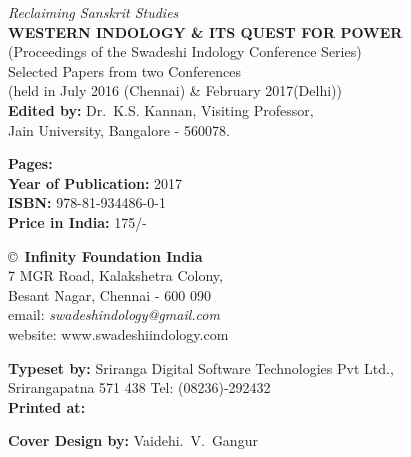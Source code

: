 \thispagestyle{empty}
\noindent
{\fontsize{9}{11}\selectfont\sl Reclaiming Sanskrit Studies}\\
{\bf WESTERN INDOLOGY \& ITS QUEST FOR POWER}\\ 
(Proceedings of the Swadeshi Indology Conference Series)\\
Selected Papers from two Conferences\\ 
(held in July 2016 (Chennai) \& February 2017(Delhi))\\
{\bf Edited by:} Dr.\ K.S. Kannan, Visiting Professor,\\ 
Jain University, Bangalore - 560078.
\vfill

\noindent
{\bf Pages:} \pageref{bookend}\\
{\bf Year of Publication:} 2017\\
{\bf ISBN:} 978-81-934486-0-1\\
{\bf Price in India:} 175/-
\vfill

\noindent
\copyright\ {\bf Infinity Foundation India}\\ 
7 MGR Road, Kalakshetra Colony,\\ 
Besant Nagar, Chennai - 600 090\\
email: {\sl swadeshindology@gmail.com}\\ 
website: www.swadeshiindology.com 
\vfill

\noindent
{\bf Typeset by:} Sriranga Digital Software Technologies Pvt Ltd.,\\ 
Srirangapatna 571 438 Tel: (08236)-292432\\

\noindent
{\bf Printed at:}

\noindent
{\bf Cover Design by:} Vaidehi.\ V.\ Gangur
